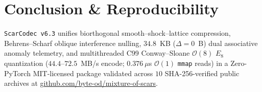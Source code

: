 \documentclass[10pt,twocolumn]{article}
\begin{document}
\section{Conclusion \& Reproducibility}
\texttt{ScarCodec v6.3} unifies biorthogonal smooth--shock--lattice compression, Behrens--Scharf oblique interference nulling, $34.8$~KB ($\Delta=0$~B) dual associative anomaly telemetry, and multithreaded C99 Conway--Sloane $\mathcal{O}(8)$ $E_8$ quantization ($44.4$--$72.5$~MB/s encode; $0.376~\mu$s $\mathcal{O}(1)$ \texttt{mmap} reads) in a Zero-PyTorch MIT-licensed package validated across $10$ SHA-256-verified public archives at \href{https://github.com/byte-od/mixture-of-scars}{github.com/byte-od/mixture-of-scars}.



\end{document}

